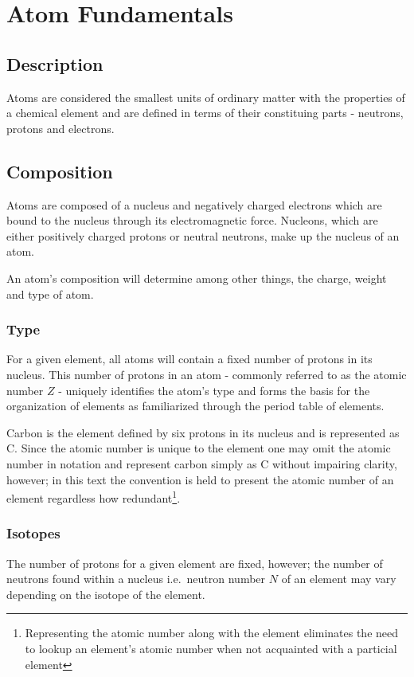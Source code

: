 \section{Atom Fundamentals}
\subsection{Description}
Atoms are considered the smallest units of ordinary matter with the
properties of a chemical element and are defined in terms of their constituing
parts - neutrons, protons and electrons.

\subsection{Composition}
Atoms are composed of a nucleus and negatively charged electrons which are
bound to the nucleus through its electromagnetic force.
Nucleons, which are either positively charged protons or neutral neutrons,
make up the nucleus of an atom.

An atom's composition will determine among other things, the charge, weight and
type of atom.

\subsubsection{Type}
For a given element, all atoms will contain a fixed number of protons in its
nucleus.
This number of protons in an atom - commonly referred to as the atomic number
 $Z$ - uniquely identifies the atom's type and forms the
basis for the organization of elements as familiarized through the period table
of elements.

Carbon is the element defined by six protons in its nucleus and is represented
as C. Since the atomic number is unique to the element one may omit the
atomic number in notation and represent carbon simply as \ce{}C without
impairing clarity, however; in this text the convention is held to present the
atomic number of an element regardless how redundant\footnote{Representing the
atomic number along with the element eliminates the need to lookup an element's
atomic number when not acquainted with a particial element}.

\subsubsection{Isotopes}
The number of protons for a given element are fixed, however; the number of
neutrons found within a nucleus i.e.\ neutron number $N$ of an element may vary
depending on the isotope of the element.

